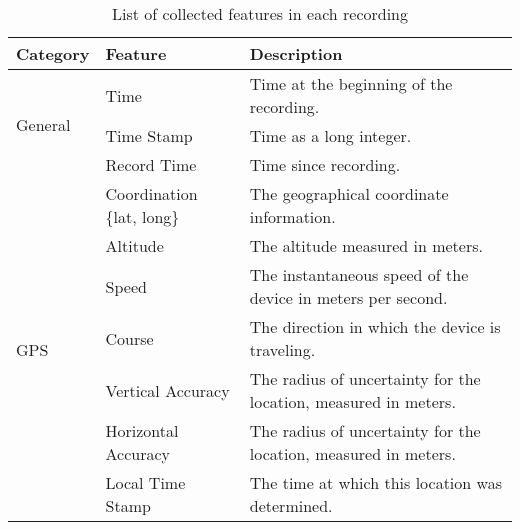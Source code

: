 \begin{table*}[h]
\label{table-features}
\caption{List of collected features in each recording}
\begin{tabular}{|l|p{3.5cm}|p{10.5cm}|}
\hline
\textbf{Category}               & \textbf{Feature}              & \textbf{Description} \\ \hline
\multirow{3}{*}{General}        & Time                           & Time at the beginning of the recording.                                                                    \\ \cline{2-3} 
                                & Time Stamp                     & Time as a long integer.                                                                                    \\ \cline{2-3} 
                                & Record Time                    & Time since recording.                                                                                      \\ \hline
\multirow{7}{*}{GPS}            & Coordination \{lat, long\}     & The geographical coordinate information.                                                                   \\ \cline{2-3} 
                                & Altitude                       & The altitude measured in meters.                                                                           \\ \cline{2-3} 
                                & Speed                          & The instantaneous speed of the device in meters per second.                                                \\ \cline{2-3} 
                                & Course                         & The direction in which the device is traveling.                                                            \\ \cline{2-3} 
                                & Vertical Accuracy              & The radius of uncertainty for the location, measured in meters.                                            \\ \cline{2-3} 
                                & Horizontal Accuracy            & The radius of uncertainty for the location, measured in meters.                                            \\ \cline{2-3} 
                                & Local Time Stamp               & The time at which this location was determined.                                                            \\ \hline

\end{tabular}
\end{table*}

